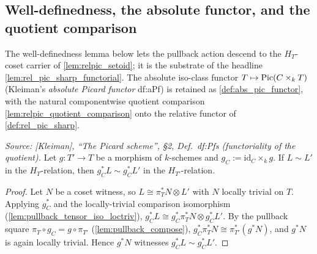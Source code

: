 \subsection{Well-definedness, the absolute functor, and the quotient comparison}
\label{subsec:relpic_relative_functor}


The well-definedness lemma below lets the pullback action descend to the
\(H_T\)-coset carrier of \cref{lem:relpic_setoid}; it is the substrate of
the headline \cref{lem:rel_pic_sharp_functorial}. The absolute iso-class
functor \(T \mapsto \operatorname{Pic}(C \times_k T)\) (Kleiman's \emph{absolute Picard
functor} df:aPf) is retained as \cref{def:abs_pic_functor}, with the
natural componentwise quotient comparison
\cref{lem:relpic_quotient_comparison} onto the relative functor of
\cref{def:rel_pic_sharp}.

\begin{lemma}\leanok
  \label{lem:relpic_pullback_welldef}
  \textit{Source: [Kleiman], ``The Picard scheme'', \S 2, Def.~df:Pfs
  (functoriality of the quotient).}
  Let \(g : T' \to T\) be a morphism of \(k\)-schemes and
  \(g_C := \mathrm{id}_C \times_k g\). If \(L \sim L'\) in the
  \(H_T\)-relation, then \(g_C^* L \sim g_C^* L'\) in the
  \(H_{T'}\)-relation.
\end{lemma}

\begin{proof}\leanok
  Let \(N\) be a coset witness, so \(L \cong \pi_T^* N \otimes L'\) with
  \(N\) locally trivial on \(T\). Applying \(g_C^*\) and the locally-trivial
  comparison isomorphism (\cref{lem:pullback_tensor_iso_loctriv}),
  \(g_C^* L \cong g_C^* \pi_T^* N \otimes g_C^* L'\). By the pullback square
  \(\pi_T \circ g_C = g \circ \pi_{T'}\) (\cref{lem:pullback_compose}),
  \(g_C^* \pi_T^* N \cong \pi_{T'}^* (g^* N)\), and \(g^* N\) is again
  locally trivial. Hence \(g^* N\) witnesses \(g_C^* L \sim g_C^* L'\).
\end{proof}

